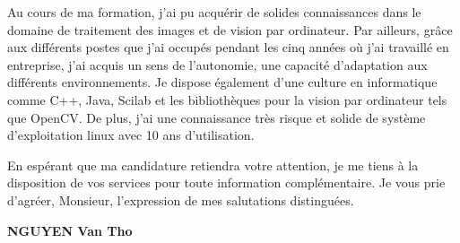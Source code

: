 \documentclass[11pt]{report}
\begin{document}
Au cours de ma formation, j'ai pu acquérir de solides connaissances dans le domaine de 
traitement des images et de vision par ordinateur. Par ailleurs, grâce aux 
différents postes que j'ai occupés pendant les cinq années où j'ai travaillé en 
entreprise, j'ai acquis un sens de l'autonomie, une capacité d'adaptation aux différents 
environnements. Je dispose également d'une culture en informatique comme C++, Java, 
Scilab et les bibliothèques pour la vision par ordinateur tels que OpenCV. De plus, j'ai 
une connaissance très risque et solide de système d'exploitation linux avec 10 ans 
d'utilisation.

En espérant que ma candidature retiendra votre attention, je me tiens à la disposition de 
vos services pour toute information complémentaire. Je vous prie d'agréer,
Monsieur, l'expression de mes salutations distinguées.\\[2em]

\begin{flushright}
{\bfseries NGUYEN Van Tho}\\
\end{flushright}
 
\end{document}
